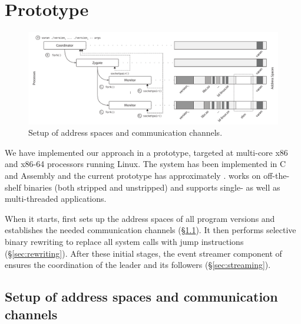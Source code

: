 \section{Prototype}
\label{sec:prototype}


\begin{figure}[t]
  \begin{center}
    \includegraphics[width=\textwidth]{efficient-execution/figures/address-space}
    \caption{Setup of address spaces and communication channels.}
    \label{fig:setup}
  \end{center}
\end{figure}


We have implemented our approach in a prototype, targeted at multi-core x86 and
x86-64 processors running Linux. The system has been implemented in C and
Assembly and the current prototype has approximately \varanSLOC. \varan works
on off-the-shelf binaries (both stripped and unstripped) and supports single-
as well as multi-threaded applications.

When it starts, \varan first sets up the address spaces of all program
versions and establishes the needed communication channels
(\S\ref{sec:setup}).  It then performs selective binary rewriting to
replace all system calls with  jump instructions
(\S\ref{sec:rewriting}).  After these initial stages, the event
streamer component of \varan ensures the coordination of the leader and
its followers (\S\ref{sec:streaming}).


\subsection{Setup of address spaces and communication channels}
\label{sec:setup}

